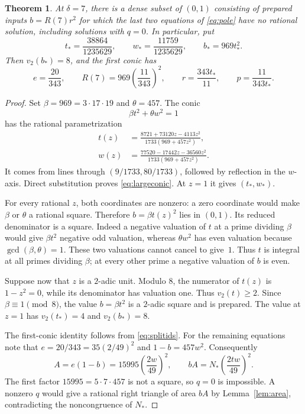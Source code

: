 \documentclass[11pt,a4paper]{article}
\newtheorem{theorem}{Theorem}[section]
\theoremstyle{definition}\newtheorem{definition}[theorem]{Definition}
\begin{document}
\begin{theorem}\label{thm:split}
At $\delta=7$, there is a dense subset of $(0,1)$ consisting of prepared
inputs $b=R(7)r^2$ for which the last two equations of \eqref{eq:pole}
have no rational solution, including solutions with $q=0$. In particular,
put
\[
 t_* =\frac{38864}{1235629},\qquad
 w_* =\frac{11759}{1235629},\qquad b_*=969t_*^2.
\]
Then $v_2(b_*)=8$, and the first conic has
\[
 e=\frac{20}{343},\qquad R(7)=969\left(\frac{11}{343}\right)^2,
 \qquad r=\frac{343t_*}{11},\qquad p=\frac{11}{343t_*}.
\]
\end{theorem}
\begin{proof}
Set $\beta=969=3\cdot17\cdot19$ and $\theta=457$. The conic
\begin{equation}\label{eq:largeconic}
                         \beta t^2+\theta w^2=1
\end{equation}
has the rational parametrization
\begin{equation}\label{eq:largeparam}
 \begin{split}
 t(z)&=\frac{8721+73120z-4113z^2}{1733(969+457z^2)},\\
 w(z)&=\frac{77520-17442z-36560z^2}{1733(969+457z^2)}.
 \end{split}
\end{equation}
It comes from lines through $(9/1733,80/1733)$, followed by reflection
in the $w$-axis. Direct substitution proves \eqref{eq:largeconic}.
At $z=1$ it gives $(t_*,w_*)$.

For every rational $z$, both coordinates are nonzero: a zero coordinate
would make $\beta$ or $\theta$ a rational square. Therefore
$b=\beta t(z)^2$ lies in $(0,1)$. Its reduced denominator is a square.
Indeed a negative valuation of $t$ at a prime dividing $\beta$ would
give $\beta t^2$ negative odd valuation, whereas $\theta w^2$ has even
valuation because $\gcd(\beta,\theta)=1$. These two valuations cannot
cancel to give~$1$. Thus $t$ is integral at all primes dividing $\beta$;
at every other prime a negative valuation of $b$ is even.

Suppose now that $z$ is a $2$-adic unit. Modulo $8$, the numerator of
$t(z)$ is $1-z^2=0$, while its denominator has valuation one. Thus
$v_2(t)\ge2$. Since $\beta\equiv1\pmod8$, the value $b=\beta t^2$
is a $2$-adic square and is prepared. The value at $z=1$ has
$v_2(t_*)=4$ and $v_2(b_*)=8$.

The first-conic identity follows from \eqref{eq:splitids}. For the
remaining equations note that $e=20/343=35(2/49)^2$ and
$1-b=457w^2$. Consequently
\begin{equation}\label{eq:areas}
 A=e(1-b)=15995\left(\frac{2w}{49}\right)^2,
 \qquad
 bA=N_*\left(\frac{2tw}{49}\right)^2.
\end{equation}
The first factor $15995=5\cdot7\cdot457$ is not a square, so $q=0$
is impossible. A nonzero $q$ would give a rational right triangle of area
$bA$ by Lemma~\ref{lem:area}, contradicting the noncongruence of $N_*$.


\end{proof}
\end{document}
